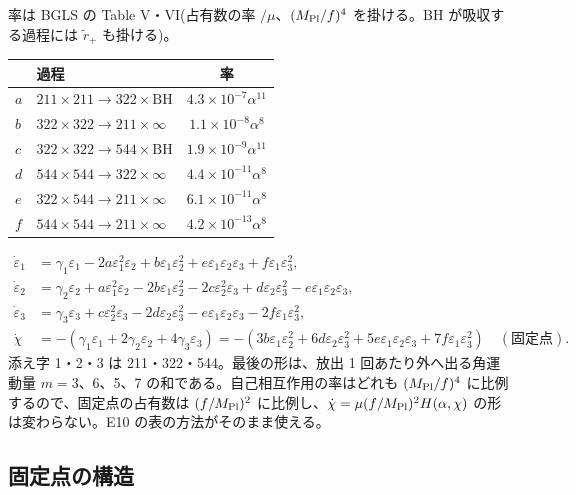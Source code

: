 率は BGLS の Table V・VI(占有数の率 $/\mu$、$(M_\mathrm{Pl}/f)^4$ を掛ける。BH が吸収する過程には $\tilde r_+$ も掛ける)。
\begin{center}\small
\begin{tabular}{llc}
\toprule
 & 過程 & 率 \\
\midrule
$a$ & $211\times211\to322\times\mathrm{BH}$ & $4.3\times10^{-7}\alpha^{11}$ \\
$b$ & $322\times322\to211\times\infty$ & $1.1\times10^{-8}\alpha^8$ \\
$c$ & $322\times322\to544\times\mathrm{BH}$ & $1.9\times10^{-9}\alpha^{11}$ \\
$d$ & $544\times544\to322\times\infty$ & $4.4\times10^{-11}\alpha^8$ \\
$e$ & $322\times544\to211\times\infty$ & $6.1\times10^{-11}\alpha^8$ \\
$f$ & $544\times544\to211\times\infty$ & $4.2\times10^{-13}\alpha^8$ \\
\bottomrule
\end{tabular}
\end{center}
\begin{align}
\dot\varepsilon_1&=\gamma_1\varepsilon_1-2a\varepsilon_1^2\varepsilon_2+b\varepsilon_1\varepsilon_2^2+e\varepsilon_1\varepsilon_2\varepsilon_3+f\varepsilon_1\varepsilon_3^2,\\
\dot\varepsilon_2&=\gamma_2\varepsilon_2+a\varepsilon_1^2\varepsilon_2-2b\varepsilon_1\varepsilon_2^2-2c\varepsilon_2^2\varepsilon_3+d\varepsilon_2\varepsilon_3^2-e\varepsilon_1\varepsilon_2\varepsilon_3,\\
\dot\varepsilon_3&=\gamma_3\varepsilon_3+c\varepsilon_2^2\varepsilon_3-2d\varepsilon_2\varepsilon_3^2-e\varepsilon_1\varepsilon_2\varepsilon_3-2f\varepsilon_1\varepsilon_3^2,\\
\dot\chi&=-(\gamma_1\varepsilon_1+2\gamma_2\varepsilon_2+4\gamma_3\varepsilon_3)
=-(3b\varepsilon_1\varepsilon_2^2+6d\varepsilon_2\varepsilon_3^2+5e\varepsilon_1\varepsilon_2\varepsilon_3+7f\varepsilon_1\varepsilon_3^2)\quad(\text{固定点}).
\end{align}
添え字 1・2・3 は 211・322・544。最後の形は、放出 1 回あたり外へ出る角運動量 $m=3$、6、5、7 の和である。自己相互作用の率はどれも $(M_\mathrm{Pl}/f)^4$ に比例するので、固定点の占有数は $(f/M_\mathrm{Pl})^2$ に比例し、$\dot\chi=\mu(f/M_\mathrm{Pl})^2H(\alpha,\chi)$ の形は変わらない。E10 の表の方法がそのまま使える。

\subsection{固定点の構造}

